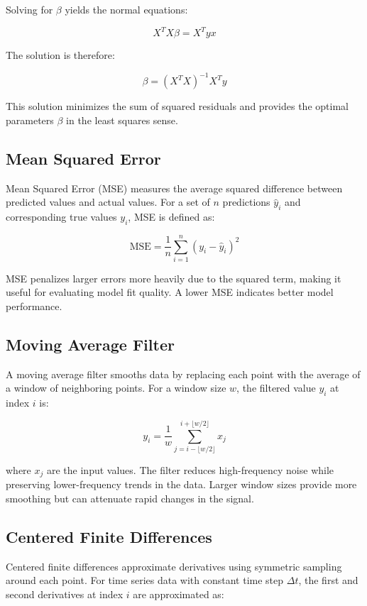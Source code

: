 Solving for \(\beta\) yields the normal equations:

\begin{equation}
\label{eq:normal_equations}
X^TX\beta = X^Tyx
\end{equation}

The solution is therefore:

\begin{equation}
\label{eq:least_squares_solution}
\beta = (X^TX)^{-1}X^Ty
\end{equation}

This solution minimizes the sum of squared residuals and provides the optimal parameters \(\beta\) in the least squares sense.

\subsection{Mean Squared Error}
Mean Squared Error (MSE) measures the average squared difference between predicted values and actual values. For a set of \(n\) predictions \(\hat{y}_i\) and corresponding true values \(y_i\), MSE is defined as:

\begin{equation}
\label{eq:mse}
\text{MSE} = \frac{1}{n}\sum_{i=1}^n (y_i - \hat{y}_i)^2
\end{equation}

MSE penalizes larger errors more heavily due to the squared term, making it useful for evaluating model fit quality. A lower MSE indicates better model performance.


\subsection{Moving Average Filter}
A moving average filter smooths data by replacing each point with the average of a window of neighboring points. For a window size \(w\), the filtered value \(y_i\) at index \(i\) is:

\begin{equation}
\label{eq:moving_average}
y_i = \frac{1}{w}\sum_{j=i-\lfloor w/2 \rfloor}^{i+\lfloor w/2 \rfloor} x_j
\end{equation}

where \(x_j\) are the input values. The filter reduces high-frequency noise while preserving lower-frequency trends in the data. Larger window sizes provide more smoothing but can attenuate rapid changes in the signal.

\subsection{Centered Finite Differences}
Centered finite differences approximate derivatives using symmetric sampling around each point. For time series data with constant time step \(\Delta t\), the first and second derivatives at index \(i\) are approximated as:


